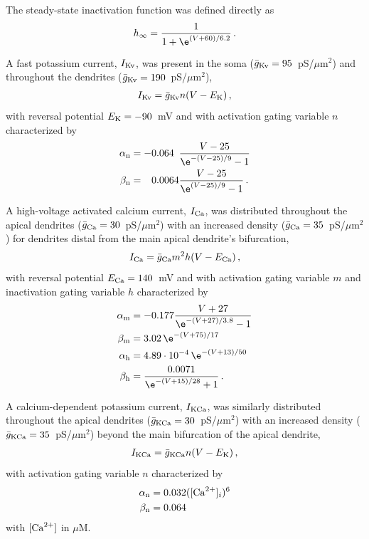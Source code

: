 The steady-state inactivation function was defined directly as
\begin{align}
h_\infty=\frac{1}{1+\e^{(V+60)/6.2}}\,.
\end{align}

A fast potassium current, $I_{\rm Kv}$, was present in the soma ($\bar{g}_{\rm Kv}=95$~pS/$\mu$m$^2$) and throughout the dendrites ($\bar{g}_{\rm Kv}=190$~pS/$\mu$m$^2$),
\begin{align}
I_{\rm Kv} = \bar{g}_{\rm Kv} n (V - E_{\rm K}) \,,
\end{align}
with reversal potential $E_{\rm K}=-90$~mV and with activation gating variable $n$ characterized by
\begin{equation}
\begin{alignedat}{3}
\alpha_{\rm n} &= - && 0.064  && \frac{V-25}{\e^{-(V-25)/9}-1} \\
\beta_{\rm n}  &=   && 0.0064 && \frac{V-25}{\e^{ (V-25)/9}-1}\,.
\end{alignedat}
\end{equation}

A high-voltage activated calcium current, $I_{\rm Ca}$, was distributed throughout the apical dendrites ($\bar{g}_{\rm Ca}=30$~pS/$\mu$m$^2$) with an increased density ($\bar{g}_{\rm Ca}=35$~pS/$\mu$m$^2$) for dendrites distal from the main apical dendrite's bifurcation,
\begin{equation}
I_{\rm Ca} = \bar{g}_{\rm Ca} m^2 h (V - E_{\rm Ca})\,,
\end{equation}
with reversal potential $E_{\rm Ca}=140$~mV and with activation gating variable $m$ and inactivation gating variable $h$ characterized by
\begin{equation}
\begin{aligned}
\alpha_{\rm m} &= - 0.177 \frac{V+27}{\e^{-(V+27)/3.8}-1} \\
\beta_{\rm m}  &= 3.02\, \e^{-(V+75)/17} \\
\alpha_{\rm h} &= 4.89 \cdot 10^{-4} \, \e^{-(V+13)/50} \\
\beta_{\rm h}  &= \frac{0.0071}{\e^{-(V+15)/28}+1}\,.
\end{aligned}
\end{equation}

A calcium-dependent potassium current, $I_{\rm KCa}$, was similarly distributed throughout the apical dendrites ($\bar{g}_{\rm KCa}=30$~pS/$\mu$m$^2$) with an increased density ($\bar{g}_{\rm KCa}=35$~pS/$\mu$m$^2$) beyond the main bifurcation of the apical dendrite,
\begin{align}
I_{\rm KCa} = \bar{g}_{\rm KCa} n (V - E_{\rm K}) \,,
\end{align}
with activation gating variable $n$ characterized by
\begin{equation}
\begin{aligned}
\alpha_{\rm n} &= 0.032 ([{\rm Ca}^{2+}]_i)^6 \\
\beta_{\rm n}  &= 0.064\,
\end{aligned}
\end{equation}
with $[{\rm Ca}^{2+}]$ in $\mu$M.

